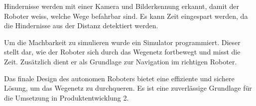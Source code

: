 Hindernisse werden mit einer Kamera und Bilderkennung erkannt, damit der Roboter weiss, welche Wege befahrbar sind. Es kann Zeit eingespart werden, da die Hindernisse aus der Distanz detektiert werden.

Um die Machbarkeit zu simulieren wurde ein Simulator programmiert. Dieser stellt dar, wie der Roboter sich durch das Wegenetz fortbewegt und misst die Zeit. Zusätzlich dient er als Grundlage zur Navigation im richtigen Roboter.

Das finale Design des autonomen Roboters bietet eine effiziente und sichere Lösung, um das Wegenetz zu durchqueren. Es ist eine zuverlässige Grundlage für die Umsetzung in Produktentwicklung 2.

